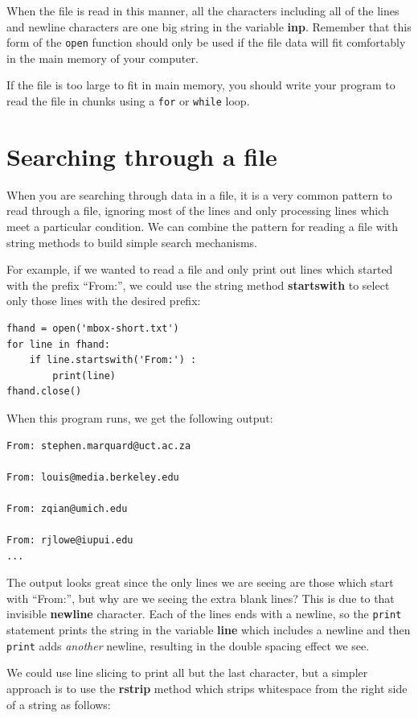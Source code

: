 When the file is read in this manner, all the characters including 
all of the lines and newline characters are one big string 
in the variable {\bf inp}.  
Remember that this form of the {\tt open} function should only be used
if the file data will fit comfortably in the main memory 
of your computer.

If the file is too large to fit in main memory, you should write
your program to read the file in chunks using a {\tt for} or {\tt while}
loop.

\section{Searching through a file}

When you are searching through data in a file, it
is a very common pattern to read through a file, ignoring most
of the lines and only processing lines which meet a particular condition.
We can combine the pattern for reading a file with string methods
to build simple search mechanisms.

For example, if we wanted to read a file and only print out lines
which started with the prefix ``From:'', we could use the 
string method {\bf startswith} to select only those lines with
the desired prefix:

\beforeverb
\begin{verbatim}
fhand = open('mbox-short.txt')
for line in fhand:
    if line.startswith('From:') :
        print(line)
fhand.close()        
\end{verbatim}
\afterverb
%
When this program runs, we get the following output:

\beforeverb
\begin{verbatim}
From: stephen.marquard@uct.ac.za

From: louis@media.berkeley.edu

From: zqian@umich.edu

From: rjlowe@iupui.edu
...
\end{verbatim}
\afterverb
%
The output looks great since the only lines we are seeing are those 
which start with ``From:'', but why are we seeing the extra blank
lines?  This is due to that invisible {\bf newline} character.
Each of the lines ends with a newline, so the {\tt print} 
statement prints the string in the variable {\bf line} which includes
a newline and then {\tt print} adds \emph{another} newline, resulting
in the double spacing effect we see.

We could use line slicing to print all but the last character, but 
a simpler approach is to use the {\bf rstrip} method which strips
whitespace from the right side of a string as follows:

